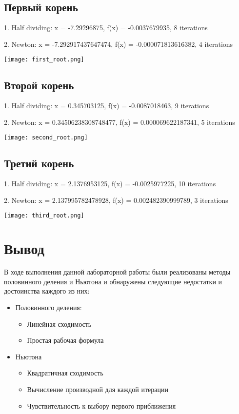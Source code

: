 \documentclass[12pt, a4paper]{article}
\begin{document}
\subsection*{Первый корень}

1. Half dividing: x = -7.29296875, f(x) = -0.0037679935, 8 iterations

2. Newton: x = -7.292917437647474, f(x) = -0.000071813616382, 4 iterations

\texttt{[image: first\_root.png]}

\subsection*{Второй корень}

1. Half dividing: x = 0.345703125, f(x) = -0.0087018463, 9 iterations

2. Newton: x = 0.34506238308748477, f(x) = 0.000069622187341, 5 iterations

\texttt{[image: second\_root.png]}

\subsection*{Третий корень}

1. Half dividing: x = 2.1376953125, f(x) = -0.0025977225, 10 iterations

2. Newton: x = 2.137995782478928, f(x) = 0.002482390999789, 3 iterations

\texttt{[image: third\_root.png]}

\section*{Вывод}
В ходе выполнения данной лабораторной работы были реализованы методы половинного деления и Ньютона и обнаружены следующие недостатки и 
достоинства каждого из них:
\begin{itemize}
  \item Половинного деления:
  \begin{itemize}
    \item Линейная сходимость
    \item Простая рабочая формула
  \end{itemize}
  \item Ньютона
  \begin{itemize}
    \item Квадратичная сходимость
    \item Вычисление производной для каждой итерации
    \item Чувствительность к выбору первого приближения
  \end{itemize}
\end{itemize}
\end{document}

